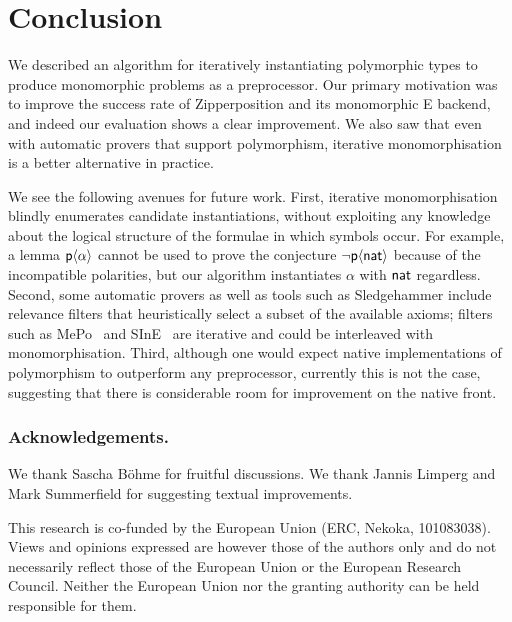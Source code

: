 \documentclass[runningheads]{llncs}
\begin{document}
\section{Conclusion}
\label{sec:conclusion}

We described an algorithm for iteratively instantiating polymorphic types to
produce monomorphic problems as a preprocessor. Our primary motivation was to
improve the success rate of Zipperposition and its monomorphic E backend, and
indeed our evaluation shows a clear improvement. We also saw that even with
automatic provers that support polymorphism, iterative monomorphisation is a
better alternative in practice.

We see the following avenues for future work. First, iterative monomorphisation
blindly enumerates candidate instantiations, without exploiting any knowledge
about the logical structure of the formulae in which symbols occur. For
example, a lemma $\textsf{p}\langle\alpha\rangle$ cannot be used to prove the
conjecture $\lnot \textsf{p}\langle\textsf{nat}\rangle$ because of the incompatible
polarities, but our algorithm instantiates $\alpha$ with $\textsf{nat}$ regardless.
Second, some automatic provers as well as tools such as Sledgehammer include
relevance filters that heuristically select a subset of the available axioms;
filters such as MePo~\cite{meng-paulson-2009} and SInE~\cite{hoder-voronkov-2011} are iterative and could be interleaved with
monomorphisation. Third, although one would expect native implementations of
polymorphism to outperform any preprocessor, currently this is not the case, suggesting that there is considerable room for improvement on the native front.

\begin{credits}
   \subsubsection{Acknowledgements.}

   We thank Sascha Böhme for fruitful discussions.
   We thank Jannis Limperg and Mark Summerfield for suggesting textual improvements.

   This research is co-funded by the European Union (ERC, Nekoka, 101083038). Views and opinions expressed are however those of the authors only and do not necessarily reflect those of the European Union or the European Research Council. Neither the European Union nor the granting authority can be held responsible for them.
\end{credits}



\end{document}
